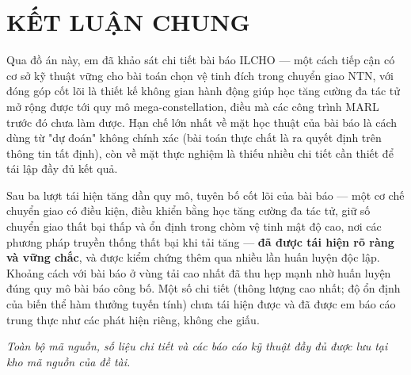 \documentclass{article} %
\begin{document}
\newpage
\section*{KẾT LUẬN CHUNG}
Qua đồ án này, em đã khảo sát chi tiết bài báo ILCHO — một cách tiếp cận có cơ sở kỹ thuật vững cho bài toán chọn vệ tinh đích trong chuyển giao NTN, với đóng góp cốt lõi là thiết kế không gian hành động giúp học tăng cường đa tác tử mở rộng được tới quy mô mega-constellation, điều mà các công trình MARL trước đó chưa làm được. Hạn chế lớn nhất về mặt học thuật của bài báo là cách dùng từ "dự đoán" không chính xác (bài toán thực chất là ra quyết định trên thông tin tất định), còn về mặt thực nghiệm là thiếu nhiều chi tiết cần thiết để tái lập đầy đủ kết quả.

Sau ba lượt tái hiện tăng dần quy mô, tuyên bố cốt lõi của bài báo — một cơ chế chuyển giao có điều kiện, điều khiển bằng học tăng cường đa tác tử, giữ số chuyển giao thất bại thấp và ổn định trong chòm vệ tinh mật độ cao, nơi các phương pháp truyền thống thất bại khi tải tăng — \textbf{đã được tái hiện rõ ràng và vững chắc}, và được kiểm chứng thêm qua nhiều lần huấn luyện độc lập. Khoảng cách với bài báo ở vùng tải cao nhất đã thu hẹp mạnh nhờ huấn luyện đúng quy mô bài báo công bố. Một số chi tiết (thông lượng cao nhất; độ ổn định của biến thể hàm thưởng tuyến tính) chưa tái hiện được và đã được em báo cáo trung thực như các phát hiện riêng, không che giấu.

\noindent\emph{Toàn bộ mã nguồn, số liệu chi tiết và các báo cáo kỹ thuật đầy đủ được lưu tại kho mã nguồn của đề tài.}

\newpage
{}


\newpage
\end{document}
